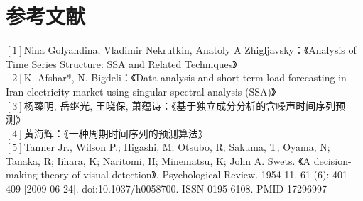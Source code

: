 \documentclass[a4paper]{article}
\begin{document}
\part*{参考文献}
\flushleft
$\left[1\right]$Nina Golyandina, Vladimir Nekrutkin, Anatoly A Zhigljavsky：《Analysis of Time Series Structure: SSA and Related Techniques》\\
$\left[2\right]$K. Afshar*, N. Bigdeli：《Data analysis and short term load forecasting in Iran electricity
market using singular spectral analysis (SSA)》\\
$\left[3\right]$杨臻明, 岳继光, 王晓保, 萧蕴诗：《基于独立成分分析的含噪声时间序列预测》\\
$\left[4\right]$黄海辉：《一种周期时间序列的预测算法》\\
$\left[5\right]$Tanner Jr., Wilson P.; Higashi, M; Otsubo, R; Sakuma, T; Oyama, N; Tanaka, R; Iihara, K; Naritomi, H; Minematsu, K; John A. Swets. 《A decision-making theory of visual detection》. Psychological Review. 1954-11, 61 (6): 401–409 [2009-06-24]. doi:10.1037/h0058700. ISSN 0195-6108. PMID 17296997\\
\end{document}
